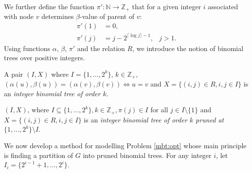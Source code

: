 We further define the function $\pi':\mathbb{N}\to\mathbb{Z}_+$ that for a given integer $i$ associated with node $v$
determines $\beta$-value of parent of $v$:
\begin{align*}
\label{eq:piprime}
\pi'(1)&=0,& \\
\pi'(j)&=j-2^{\lceil\log j\rceil -1}, &j > 1.
\end{align*}
Using functions $\alpha$, $\beta$, $\pi'$ and the relation $R$, we introduce the notion of binomial trees over positive integers.
\begin{definition}
A pair $(I,X)$ where $I=\{1,\dots,2^k\}$, $k\in\mathbb{Z}_+$, $(\alpha(u),\beta(u))=(\alpha(v),\beta(v))\Leftrightarrow u=v$ and
$X=\{(i,j)\in R, i,j\in I\}$ is an \emph{integer binomial tree of order $k$}.

$(I,X)$, where $I\subseteq\{1,\dots,2^k\}, k\in \mathbb{Z}_+,\pi(j)\in I$ for all $j\in I\setminus\{1\}$ and
$X=\{(i,j)\in R, i,j\in I\}$ is an \emph{integer binomial tree of order $k$ pruned at $\{1,\dots,2^k\}\setminus I$}.
\end{definition}
We now develop a method for modelling Problem \ref{mbt:opt} whose main principle is finding a partition of $G$ into pruned binomial trees.
For any integer $i$, let $I_i=\{2^{i-1}+1,\dots,2^i\}$.

